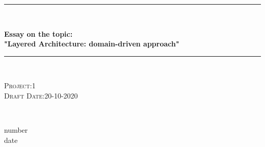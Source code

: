 \begin{titlepage}

	\centering
    \vspace*{0.5 cm}
	\rule{\linewidth}{0.2 mm} \\[0.4cm]
	\begin{spacing}{1.1}
		\huge \bfseries Essay on the topic: \\[0.3cm]
		\LARGE "Layered Architecture: domain-driven approach"
	\end{spacing}
	\rule{\linewidth}{0.2 mm} \\[1 cm]


 
	\vfill
	\noindent
	\begin{minipage}{0.7\textwidth}
		\begin{flushright}
			\textsc{Project:1}\\
			\textsc{Draft Date:20-10-2020}\\
		\end{flushright}
	\end{minipage}~~\hspace*{1 cm}
	\begin{minipage}{0.3\textwidth}
		\begin{flushleft}
			number\\
			date\\
		\end{flushleft}
	\end{minipage}

	\clearpage

	\setcounter{page}{1}
	
	
    

    \clearpage

\end{titlepage}
